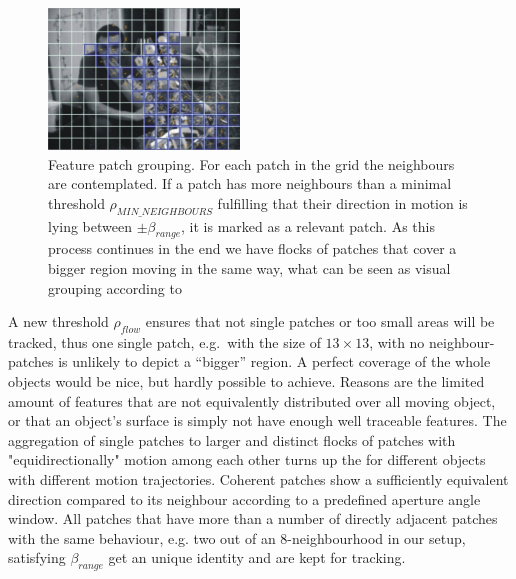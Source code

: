 \begin{figure}
	\begin{center}
		\includegraphics[width=2in]{imgs/method/selection.ps}
		\caption[Feature patch grouping. ]{Feature patch grouping. For each patch in the grid the neighbours are contemplated. If a patch has more neighbours than a minimal threshold $\rho_{MIN\_NEIGHBOURS}$ fulfilling that their direction in motion is lying between $\pm \beta_{range}$, it is marked as a relevant patch. As this process continues in the end we have flocks of patches that cover a bigger region moving in the same way, what can be seen as visual grouping according to \cite{ULGII23} }
		\label{fig:flocking}
	\end{center}
\end{figure}
%
A new threshold $\rho_{flow}$ ensures that not single patches or too small areas will be tracked, thus one single patch, e.g.\ with the size of $13 \times 13$, with no neighbour-patches is unlikely to depict a ``bigger'' region. A perfect coverage of the whole objects would be nice, but hardly possible to achieve. Reasons are the limited amount of features that are not equivalently distributed over all moving object, or that an object's surface is simply not have enough well traceable features. The aggregation of single patches to larger and distinct flocks of patches with "equidirectionally" motion among each other %
turns up the for different objects with different motion trajectories. Coherent patches show a sufficiently equivalent direction compared to its neighbour according to a predefined aperture angle window. All patches that have more than a number of directly adjacent patches with the same behaviour, e.g. two out of an 8-neighbourhood in our setup, satisfying  $\beta_{range}$ get an unique identity and are kept for tracking.
